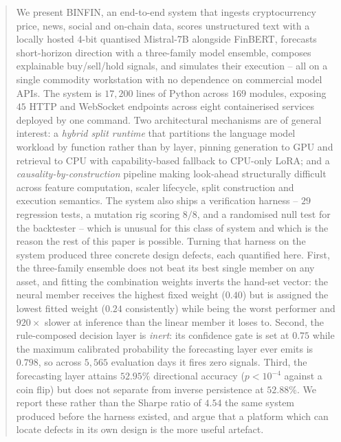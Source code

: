 \documentclass[preprint,12pt,authoryear]{elsarticle}
\begin{document}
\begin{frontmatter}
\begin{abstract}
We present BINFIN, an end-to-end system that ingests cryptocurrency price, news,
social and on-chain data, scores unstructured text with a locally hosted 4-bit
quantised Mistral-7B alongside FinBERT, forecasts short-horizon direction with a
three-family model ensemble, composes explainable buy/sell/hold signals, and
simulates their execution -- all on a single commodity workstation with no
dependence on commercial model APIs. The system is $17{,}200$ lines of Python
across $169$ modules, exposing $45$ HTTP and WebSocket endpoints across eight
containerised services deployed by one command. Two architectural mechanisms are
of general interest: a \emph{hybrid split runtime} that partitions the language
model workload by function rather than by layer, pinning generation to GPU and
retrieval to CPU with capability-based fallback to CPU-only LoRA; and a
\emph{causality-by-construction} pipeline making look-ahead structurally
difficult across feature computation, scaler lifecycle, split construction and
execution semantics. The system also ships a verification harness -- $29$
regression tests, a mutation rig scoring $8/8$, and a randomised null test for
the backtester -- which is unusual for this class of system and which is the
reason the rest of this paper is possible. Turning that harness on the system
produced three concrete design defects, each quantified here. First, the
three-family ensemble does not beat its best single member on any asset, and
fitting the combination weights inverts the hand-set vector: the neural member
receives the highest fixed weight ($0.40$) but is assigned the lowest fitted
weight ($0.24$ consistently) while being the worst performer and $920\times$
slower at inference than the linear member it loses to. Second, the
rule-composed decision layer is \emph{inert}: its confidence gate is set at
$0.75$ while the maximum calibrated probability the forecasting layer ever
emits is $0.798$, so across $5{,}565$ evaluation days it fires zero signals.
Third, the forecasting layer attains $52.95\%$ directional accuracy
($p<10^{-4}$ against a coin flip) but does not separate from inverse
persistence at $52.88\%$. We report these rather than the Sharpe ratio of
$4.54$ the same system produced before the harness existed, and argue that a
platform which can locate defects in its own design is the more useful artefact.
\end{abstract}


\end{frontmatter}
\end{document}
